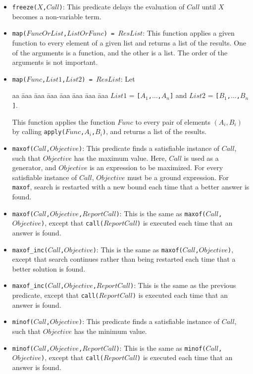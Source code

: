 \begin{itemize}
\item \texttt{freeze($X$,$Call$)}: This predicate delays the evaluation of $Call$ until $X$ becomes a non-variable term.
\item \texttt{map($FuncOrList$,$ListOrFunc$) = $ResList$}: This function applies a given function to every element of a given list and returns a list of the results. One of the arguments is a function, and the other is a list. The order of the arguments is not important. 
\item \texttt{map($Func$,$List1$,$List2$) = $ResList$}: Let
\begin{tabbing}
aa \= aaa \= aaa \= aaa \= aaa \= aaa \= aaa \= aaa \kill
\> $List1$ = \texttt{[$A_1$,$\ldots$,$A_n$]} and $List2$ = \texttt{[$B_1$,$\ldots$,$B_n$]}.
\end{tabbing}
This function applies the function $Func$ to every pair of elements $(A_i,B_i)$ by calling \texttt{apply($Func$,$A_i$,$B_i$)}, and returns a list of the results.
\item \texttt{maxof($Call$,$Objective$)}: This predicate finds a satisfiable instance of $Call$, such that $Objective$ has the maximum value. Here, $Call$ is used as a generator, and $Objective$ is an expression to be maximized. For every satisfiable instance of $Call$, $Objective$ must be a ground expression. For \texttt{maxof}, search is restarted with a new bound each time that a better answer is found.
\item \texttt{maxof($Call$,$Objective$,$ReportCall$)}: This is the same as \texttt{maxof($Call$,$Objective$)}, except that \texttt{call($ReportCall$)} is executed each time that an answer is found.
\item \texttt{maxof\_inc($Call$,$Objective$)}: This is the same as \texttt{maxof($Call$,$Objective$)}, except that search continues rather than being restarted each time that a better solution is found.
\item \texttt{maxof\_inc($Call$,$Objective$,$ReportCall$)}: This is the same as the previous predicate, except that \texttt{call($ReportCall$)} is executed each time that an answer is found.
\item \texttt{minof($Call$,$Objective$)}: This predicate finds a satisfiable instance of $Call$, such that $Objective$ has the minimum value. 
\item \texttt{minof($Call$,$Objective$,$ReportCall$)}: This is the same as \texttt{minof($Call$,$Objective$)}, except that \texttt{call($ReportCall$)} is executed each time that an answer is found.

\end{itemize}
